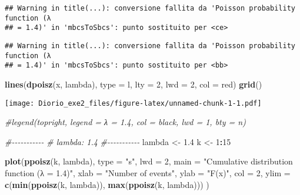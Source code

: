 \documentclass[
]{article}
\newenvironment{Shaded}{\begin{snugshade}}{\end{snugshade}}
\newcommand{\AttributeTok}[1]{\textcolor[rgb]{0.13,0.29,0.53}{#1}}
\newcommand{\CommentTok}[1]{\textcolor[rgb]{0.56,0.35,0.01}{\textit{#1}}}
\newcommand{\DecValTok}[1]{\textcolor[rgb]{0.00,0.00,0.81}{#1}}
\newcommand{\FloatTok}[1]{\textcolor[rgb]{0.00,0.00,0.81}{#1}}
\newcommand{\FunctionTok}[1]{\textcolor[rgb]{0.13,0.29,0.53}{\textbf{#1}}}
\newcommand{\NormalTok}[1]{#1}
\newcommand{\OtherTok}[1]{\textcolor[rgb]{0.56,0.35,0.01}{#1}}
\newcommand{\SpecialCharTok}[1]{\textcolor[rgb]{0.81,0.36,0.00}{\textbf{#1}}}
\newcommand{\StringTok}[1]{\textcolor[rgb]{0.31,0.60,0.02}{#1}}
\begin{document}
\begin{verbatim}
## Warning in title(...): conversione fallita da 'Poisson probability function (λ
## = 1.4)' in 'mbcsToSbcs': punto sostituito per <ce>
\end{verbatim}

\begin{verbatim}
## Warning in title(...): conversione fallita da 'Poisson probability function (λ
## = 1.4)' in 'mbcsToSbcs': punto sostituito per <bb>
\end{verbatim}

\begin{Shaded}
\begin{Highlighting}[]
\FunctionTok{lines}\NormalTok{(}\FunctionTok{dpoisz}\NormalTok{(x, lambda), }\AttributeTok{type =} \StringTok{\textquotesingle{}l\textquotesingle{}}\NormalTok{, }\AttributeTok{lty =} \DecValTok{2}\NormalTok{, }\AttributeTok{lwd =} \DecValTok{2}\NormalTok{, }\AttributeTok{col =} \StringTok{\textquotesingle{}red\textquotesingle{}}\NormalTok{)}
\FunctionTok{grid}\NormalTok{()}
\end{Highlighting}
\end{Shaded}

\texttt{[image: Diorio\_exe2\_files/figure-latex/unnamed-chunk-1-1.pdf]}

\begin{Shaded}
\begin{Highlighting}[]
\CommentTok{\#legend(\textquotesingle{}topright\textquotesingle{}, legend = \textquotesingle{}λ = 1.4\textquotesingle{}, col = \textquotesingle{}black\textquotesingle{}, lwd = 1, bty = \textquotesingle{}n\textquotesingle{})}
\end{Highlighting}
\end{Shaded}

\begin{Shaded}
\begin{Highlighting}[]
\CommentTok{\#{-}{-}{-}{-}{-}{-}{-}{-}{-}{-}{-}}
\CommentTok{\# lambda: 1.4}
\CommentTok{\#{-}{-}{-}{-}{-}{-}{-}{-}{-}{-}{-}}
\NormalTok{lambda }\OtherTok{\textless{}{-}} \FloatTok{1.4}
\NormalTok{k }\OtherTok{\textless{}{-}} \DecValTok{1}\SpecialCharTok{:}\DecValTok{15}


\FunctionTok{plot}\NormalTok{(}\FunctionTok{ppoisz}\NormalTok{(k, lambda), }\AttributeTok{type =} \StringTok{"s"}\NormalTok{, }\AttributeTok{lwd =} \DecValTok{2}\NormalTok{,}
     \AttributeTok{main =} \StringTok{"Cumulative distribution function (λ = 1.4)"}\NormalTok{,}
     \AttributeTok{xlab =} \StringTok{"Number of events"}\NormalTok{, }\AttributeTok{ylab =} \StringTok{"F(x)"}\NormalTok{, }\AttributeTok{col =} \DecValTok{2}\NormalTok{,}
     \AttributeTok{ylim =} \FunctionTok{c}\NormalTok{(}\FunctionTok{min}\NormalTok{(}\FunctionTok{ppoisz}\NormalTok{(k, lambda)), }\FunctionTok{max}\NormalTok{(}\FunctionTok{ppoisz}\NormalTok{(k, lambda)))}
\NormalTok{     )}
\end{Highlighting}
\end{Shaded}
\end{document}
